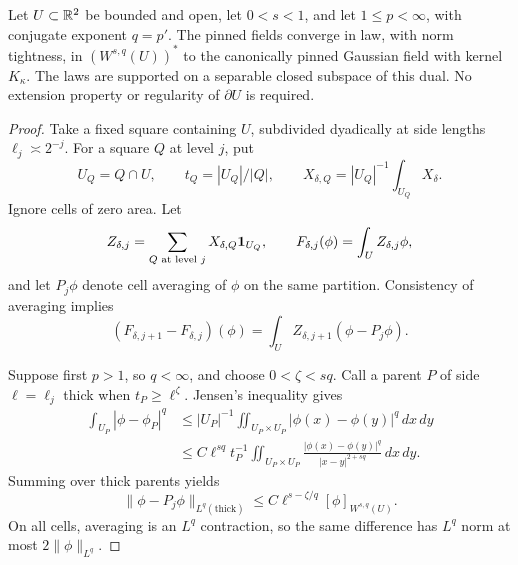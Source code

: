 \begin{proposition}\label{prop:intrinsic-dual}
Let \(U\subset\mathbb R^2\) be bounded and open, let \(0<s<1\), and let
\(1\le p<\infty\), with conjugate exponent \(q=p'\).
The pinned fields converge in law, with norm tightness, in
\((W^{s,q}(U))^*\) to the canonically pinned Gaussian field with kernel
\(K_\kappa\). The laws are supported on a separable closed subspace of
this dual. No extension property or regularity of \(\partial U\) is
required.
\end{proposition}

\begin{proof}
Take a fixed square containing \(U\), subdivided dyadically at side
lengths \(\ell_j\asymp2^{-j}\). For a square \(Q\) at level \(j\), put
\[
 U_Q=Q\cap U,\qquad t_Q=|U_Q|/|Q|,\qquad
 X_{\delta,Q}=|U_Q|^{-1}\int_{U_Q}X_\delta.
\]
Ignore cells of zero area. Let
\[
 Z_{\delta,j}=\sum_{Q\text{ at level }j}
                   X_{\delta,Q}\mathbf1_{U_Q},\qquad
 F_{\delta,j}(\phi)=\int_U Z_{\delta,j}\phi,
\]
and let \(P_j\phi\) denote cell averaging of \(\phi\) on the same
partition. Consistency of averaging implies
\begin{equation}\label{eq:prob-cell-difference}
 (F_{\delta,j+1}-F_{\delta,j})(\phi)
     =\int_U Z_{\delta,j+1}(\phi-P_j\phi).
\end{equation}

Suppose first \(p>1\), so \(q<\infty\), and choose
\(0<\zeta<sq\). Call a parent \(P\) of side \(\ell=\ell_j\) thick
when \(t_P\ge\ell^\zeta\). Jensen's inequality gives
\begin{align*}
 \int_{U_P}|\phi-\phi_P|^q
 &\le |U_P|^{-1}
            \iint_{U_P\times U_P}|\phi(x)-\phi(y)|^q\,dx\,dy\\
 &\le C\ell^{sq}t_P^{-1}
       \iint_{U_P\times U_P}
          \frac{|\phi(x)-\phi(y)|^q}{|x-y|^{2+sq}}\,dx\,dy.
\end{align*}
Summing over thick parents yields
\begin{equation}\label{eq:prob-thick-cell}
 \|\phi-P_j\phi\|_{L^q(\mathrm{thick})}
        \le C\ell^{s-\zeta/q}[\phi]_{W^{s,q}(U)}.
\end{equation}
On all cells, averaging is an \(L^q\) contraction, so the same difference
has \(L^q\) norm at most \(2\|\phi\|_{L^q}\).


\end{proof}
